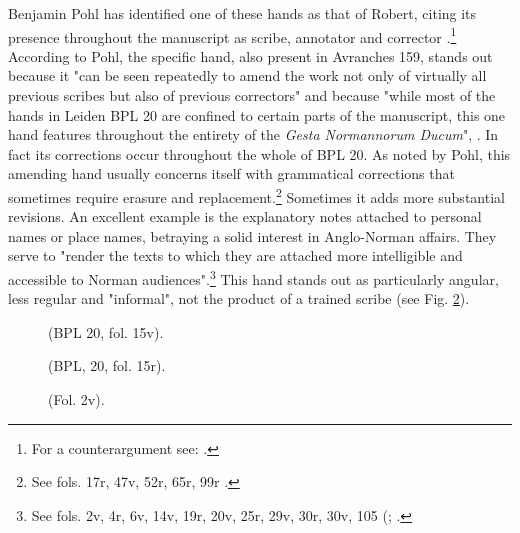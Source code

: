 \begin{paper}
Benjamin Pohl has identified one of these hands as that of Robert,
citing its presence throughout the manuscript as scribe, annotator and
corrector \citep[58--64]{pohl_abbas_2014}.\footnote{For a counterargument see:
  \cite{bisson_scripts_2019}.} According to Pohl, the specific hand, also present in
Avranches 159, stands out because it "can be seen repeatedly to amend the
work not only of virtually all previous scribes but also of previous
correctors" and because "while most of the hands in Leiden BPL 20 are
confined to certain parts of the manuscript, this one hand features
throughout the entirety of the \emph{Gesta Normannorum Ducum}", \citep[60]{pohl_abbas_2014}. In fact its corrections occur throughout the whole of BPL 20.
As noted by Pohl, this amending hand usually concerns itself with
grammatical corrections that sometimes require erasure and
replacement.\footnote{See fols. 17r, 47v, 52r, 65r, 99r \citep[60]{pohl_abbas_2014}.}
Sometimes it adds more substantial revisions. An excellent example is
the explanatory notes attached to personal names or place names,
betraying a solid interest in Anglo-Norman affairs. They serve to
"render the texts to which they are attached more intelligible and
accessible to Norman audiences".\footnote{See fols. 2v, 4r, 6v, 14v,
  19r, 20v, 25r, 29v, 30r, 30v, 105 (\cite[60]{pohl_abbas_2014}; \cite[217]{van_houts_robert_1989}.} This hand stands out as particularly angular, less regular and
"informal", not the product of a trained scribe (see Fig. \ref{fig:escobar3}).

\begin{figure}[H]
  \centering
  \begin{minipage}[b]{0.49\textwidth}
    \caption{(BPL 20, fol. 15v).}
    \label{fig:escobar1}
  \end{minipage}
  \hfill
  \begin{minipage}[b]{0.48\textwidth}
    \caption{(BPL, 20, fol. 15r).}
    \label{fig:escobar2}
  \end{minipage}
\end{figure}

\begin{figure}[H]
  \centering
    \caption{(Fol. 2v).}
    \label{fig:escobar3}
  \end{figure}


\end{paper}
